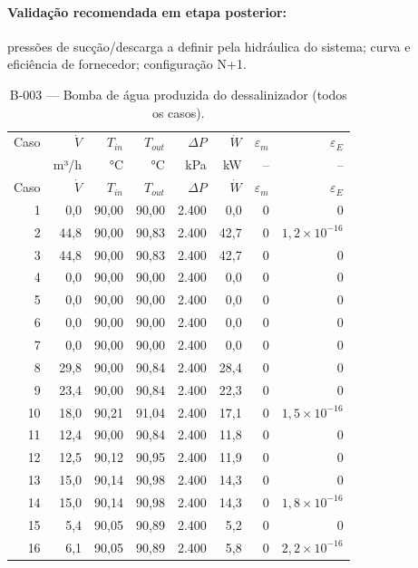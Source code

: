 \documentclass[11pt,a4paper]{article}
\numberwithin{equation}{section}
\numberwithin{table}{section}
\numberwithin{figure}{section}
\begin{document}
\paragraph{Validação recomendada em etapa posterior:} pressões de sucção/descarga a definir pela hidráulica do sistema; curva e eficiência de fornecedor; configuração N+1.
{\footnotesize\setlength{\tabcolsep}{3.5pt}\begin{longtable}{rrrrrrrr}
\caption{B-003 --- Bomba de água produzida do dessalinizador (todos os casos).\label{tab:b003}}\\\toprule
Caso & $\dot V$ & $T_{in}$ & $T_{out}$ & $\Delta P$ & $\dot W$ & $\varepsilon_m$ & $\varepsilon_E$\\
 & m³/h & °C & °C & kPa & kW & -- & --\\\midrule\endfirsthead
\toprule Caso & $\dot V$ & $T_{in}$ & $T_{out}$ & $\Delta P$ & $\dot W$ & $\varepsilon_m$ & $\varepsilon_E$\\\midrule\endhead
1 & 0,0 & 90,00 & 90,00 & 2.400 & 0,0 & $0$ & $0$\\
2 & 44,8 & 90,00 & 90,83 & 2.400 & 42,7 & $0$ & $1{,}2\times10^{-16}$\\
3 & 44,8 & 90,00 & 90,83 & 2.400 & 42,7 & $0$ & $0$\\
4 & 0,0 & 90,00 & 90,00 & 2.400 & 0,0 & $0$ & $0$\\
5 & 0,0 & 90,00 & 90,00 & 2.400 & 0,0 & $0$ & $0$\\
6 & 0,0 & 90,00 & 90,00 & 2.400 & 0,0 & $0$ & $0$\\
7 & 0,0 & 90,00 & 90,00 & 2.400 & 0,0 & $0$ & $0$\\
8 & 29,8 & 90,00 & 90,84 & 2.400 & 28,4 & $0$ & $0$\\
9 & 23,4 & 90,00 & 90,84 & 2.400 & 22,3 & $0$ & $0$\\
10 & 18,0 & 90,21 & 91,04 & 2.400 & 17,1 & $0$ & $1{,}5\times10^{-16}$\\
11 & 12,4 & 90,00 & 90,84 & 2.400 & 11,8 & $0$ & $0$\\
12 & 12,5 & 90,12 & 90,95 & 2.400 & 11,9 & $0$ & $0$\\
13 & 15,0 & 90,14 & 90,98 & 2.400 & 14,3 & $0$ & $0$\\
14 & 15,0 & 90,14 & 90,98 & 2.400 & 14,3 & $0$ & $1{,}8\times10^{-16}$\\
15 & 5,4 & 90,05 & 90,89 & 2.400 & 5,2 & $0$ & $0$\\
16 & 6,1 & 90,05 & 90,89 & 2.400 & 5,8 & $0$ & $2{,}2\times10^{-16}$\\
\bottomrule\end{longtable}}
\end{document}
